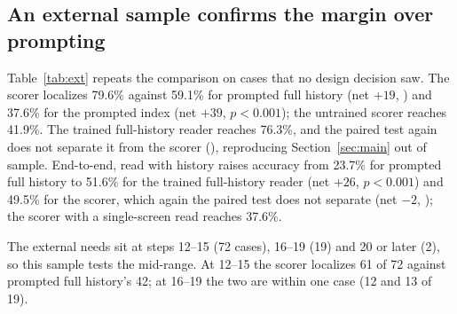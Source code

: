 \subsection{An external sample confirms the margin over prompting}
\label{sec:ext}
\begin{table}[t]
\centering\footnotesize\setlength{\tabcolsep}{4pt}
\caption{External set: 93 cases from a fourth sample of 400 trajectories, mined after we fixed every design decision. We train each condition on all 188 cross-validated cases and evaluate once. $p$ is against the trained per-screen scorer.}
\label{tab:ext}
\end{table}

Table~\ref{tab:ext} repeats the comparison on cases that no design decision saw. The scorer localizes 79.6\% against 59.1\% for prompted full history (net $+19$, ) and 37.6\% for the prompted index (net $+39$, $p<0.001$); the untrained scorer reaches 41.9\%. The trained full-history reader reaches 76.3\%, and the paired test again does not separate it from the scorer (), reproducing Section~\ref{sec:main} out of sample. End-to-end, read with history raises accuracy from 23.7\% for prompted full history to 51.6\% for the trained full-history reader (net $+26$, $p<0.001$) and 49.5\% for the scorer, which again the paired test does not separate (net $-2$, ); the scorer with a single-screen read reaches 37.6\%.

The external needs sit at steps 12--15 (72 cases), 16--19 (19) and 20 or later (2), so this sample tests the mid-range. At 12--15 the scorer localizes 61 of 72 against prompted full history's 42; at 16--19 the two are within one case (12 and 13 of 19).

